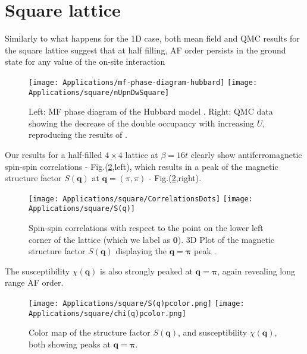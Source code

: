 \section{Square lattice}
\label{sec:square}

Similarly to what happens for the \acs{1D} case, both mean field and \ac{QMC} results for the square lattice suggest that at half filling, \ac{AF} order persists in the ground state for any value of the on-site interaction \cite{claveau_mean-field_2014, gouveia_magnetic_2015, white_numerical_1989, hirsch_two-dimensional_1985}

\begin{figure}[H]
\label{fig:mfHubbardPhaseDiagram}
\hspace{-0.18cm}
\texttt{[image: Applications/mf-phase-diagram-hubbard]}
\texttt{[image: Applications/square/nUpnDwSquare]}
\caption[Mean field phase diagram of the Hubbard model. \ac{QMC} data showing the decrease of the double occupancy with increasing $U$.]{Left: MF phase diagram of the Hubbard model \cite{gouveia_magnetic_2015}.
Right: \ac{QMC} data showing the decrease of the double occupancy with increasing $U$, reproducing the results of \cite{white_numerical_1989}.}
\end{figure}
Our results for a half-filled $4 \times 4$ lattice at $\beta = 16 t$ clearly show antiferromagnetic spin-spin correlations - Fig.(\ref{fig:corrSq},left), which results in a peak of the magnetic structure factor $S (\bm q)$ at $\bm q = (\pi, \pi)$ - Fig.(\ref{fig:corrSq},right).
\begin{figure}[H]
\texttt{[image: Applications/square/CorrelationsDots]}
\hspace{0.5cm}
\texttt{[image: Applications/square/S(q)]}
\caption[Spin-spin correlations on the square lattice.
Magnetic structure factors showing a peak at $\bm q = \bm \pi$.]{Spin-spin correlations with respect to the point on the lower left corner of the lattice (which we label as $\bm 0$).
3D Plot of the magnetic structure factor $S ( \bm q)$ displaying the $\bm q = \bm \pi$ peak \label{fig:corrSq}.}
\end{figure}
The susceptibility $\chi ( \bm q) $ is also strongly peaked at $\bm q = \bm \pi$, again revealing long range \ac{AF} order.
\begin{figure}[H]
\hspace{1cm}
\texttt{[image: Applications/square/S(q)pcolor.png]}
\hspace{0.4cm}
\texttt{[image: Applications/square/chi(q)pcolor.png]}
\caption[Color map of the structure factor $S ( \bm q)$, and susceptibility $\chi ( \bm q)$, both showing peaks at $\bm q = \bm\pi$.]{Color map of the structure factor $S ( \bm q)$, and susceptibility $\chi ( \bm q)$, both showing peaks at $\bm q = \bm\pi$.\label{fig:Schi3d}}
\end{figure}
